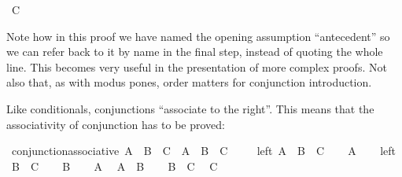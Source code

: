 \begin{isabellebody}
\ {\isachardoublequoteopen}C{\isachardoublequoteclose}\isacommand{{\isachardot}{\isachardot}}\isamarkupfalse%
\isanewline
\ \ \ \ \isamarkupfalse%
\isanewline
\ \ \isamarkupfalse%
\isanewline
{}\isamarkupfalse%
%
\endisatagproof
{\isafoldproof}%
%
\isadelimproof
%
\endisadelimproof
%
\begin{isamarkuptext}%
Note how in this proof we have named the opening assumption ``antecedent'' so we can refer
back to it by name in the final step, instead of quoting the whole line. This becomes very useful in
the presentation of more complex proofs. Not also that, as with modus pones, order matters for
conjunction introduction.%
\end{isamarkuptext}\isamarkuptrue%
%
\begin{isamarkuptext}%
Like conditionals, conjunctions ``associate to the right''. This means that the associativity
of conjunction has to be proved:%
\end{isamarkuptext}\isamarkuptrue%
\isamarkupfalse%
\ conjunction{\isacharunderscore}associative{\isacharcolon}\ {\isachardoublequoteopen}A\ {\isasymand}\ B\ {\isasymand}\ C\ {\isasymlongleftrightarrow}\ {\isacharparenleft}A\ {\isasymand}\ B{\isacharparenright}\ {\isasymand}\ C{\isachardoublequoteclose}\ \isanewline
%
\isadelimproof
%
\endisadelimproof
%
\isatagproof
{}\isamarkupfalse%
\isanewline
\ \ \isamarkupfalse%
\ left{\isacharcolon}\ {\isachardoublequoteopen}A\ {\isasymand}\ B\ {\isasymand}\ C{\isachardoublequoteclose}\isanewline
\ \ \isamarkupfalse%
\ {\isachardoublequoteopen}A{\isachardoublequoteclose}\isacommand{{\isachardot}{\isachardot}}\isamarkupfalse%
\isanewline
\ \ \isamarkupfalse%
\ left\ \isamarkupfalse%
\ {\isachardoublequoteopen}B\ {\isasymand}\ C{\isachardoublequoteclose}\isacommand{{\isachardot}{\isachardot}}\isamarkupfalse%
\isanewline
\ \ \isamarkupfalse%
\ {\isachardoublequoteopen}B{\isachardoublequoteclose}\isacommand{{\isachardot}{\isachardot}}\isamarkupfalse%
\isanewline
\ \ \isamarkupfalse%
\ {\isacharbackquoteopen}A{\isacharbackquoteclose}\ \isamarkupfalse%
\ {\isachardoublequoteopen}A\ {\isasymand}\ B{\isachardoublequoteclose}\isacommand{{\isachardot}{\isachardot}}\isamarkupfalse%
\isanewline
\ \ \isamarkupfalse%
\ {\isacharbackquoteopen}B\ {\isasymand}\ C{\isacharbackquoteclose}\ \isamarkupfalse%
\ {\isachardoublequoteopen}C{\isachardoublequoteclose}\isacommand{{\isachardot}{\isachardot}}\isamarkupfalse%

\end{isabellebody}
